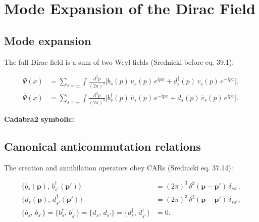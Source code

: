 \section{Mode Expansion of the Dirac Field}

\subsection{Mode expansion}

The full Dirac field is a sum of two Weyl fields
(Srednicki before eq. 39.1):
\begin{mdframed}[backgroundcolor=blue!5]
\begin{align}
\Psi(x) &= \sum_{s=\pm}\int\frac{d^3p}{(2\pi)^3}
  \bigl[ b_s(p)\,u_s(p)\,e^{ipx}
        + d_s^\dagger(p)\,v_s(p)\,e^{-ipx} \bigr] , \tag{39.1a}\\[6pt]
\bar\Psi(x) &= \sum_{s=\pm}\int\frac{d^3p}{(2\pi)^3}
  \bigl[ b_s^\dagger(p)\,\bar u_s(p)\,e^{-ipx}
        + d_s(p)\,\bar v_s(p)\,e^{ipx} \bigr] . \tag{39.1b}
\end{align}
\end{mdframed}

\textbf{Cadabra2 symbolic:}


\subsection{Canonical anticommutation relations}

The creation and annihilation operators obey CARs (Srednicki eq. 37.14):
\begin{mdframed}[backgroundcolor=green!5]
\begin{align}
\{b_s(\mathbf{p}),\,b_{s'}^\dagger(\mathbf{p}')\} &= (2\pi)^3\,\delta^3(\mathbf{p}-\mathbf{p}')\,\delta_{ss'},\\[4pt]
\{d_s(\mathbf{p}),\,d_{s'}^\dagger(\mathbf{p}')\} &= (2\pi)^3\,\delta^3(\mathbf{p}-\mathbf{p}')\,\delta_{ss'},\\[4pt]
\{b_s,\,b_{s'}\}=\{b_s^\dagger,\,b_{s'}^\dagger\}
 =\{d_s,\,d_{s'}\}=\{d_s^\dagger,\,d_{s'}^\dagger\} &= 0 . \tag{37.14}
\end{align}
\end{mdframed}

